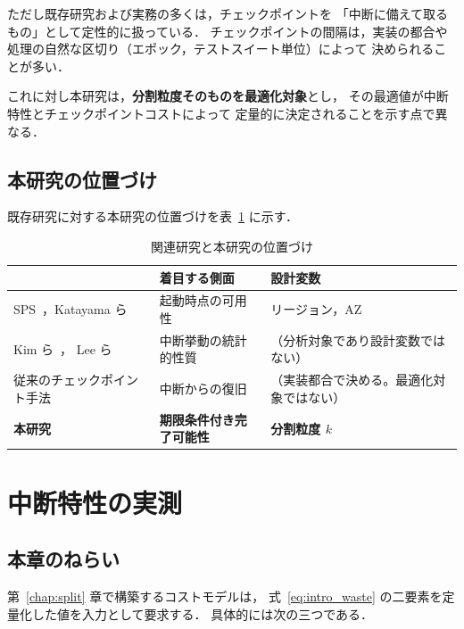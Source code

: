 \documentclass[11pt,a4paper]{ltjsreport}
\begin{document}
ただし既存研究および実務の多くは，チェックポイントを
「中断に備えて取るもの」として定性的に扱っている．
チェックポイントの間隔は，実装の都合や
処理の自然な区切り（エポック，テストスイート単位）によって
決められることが多い．

これに対し本研究は，\textbf{分割粒度そのものを最適化対象}とし，
その最適値が中断特性とチェックポイントコストによって
定量的に決定されることを示す点で異なる．

\section{本研究の位置づけ}

既存研究に対する本研究の位置づけを表~\ref{tab:related} に示す．

\begin{table}[htbp]
\centering
\caption{関連研究と本研究の位置づけ}
\label{tab:related}
\small
\begin{tabularx}{\textwidth}{@{}lXX@{}}
\toprule
 & \textbf{着目する側面} & \textbf{設計変数} \\
\midrule
SPS~\cite{AWSSPS}，Katayama ら~\cite{Katayama2022}
  & 起動時点の可用性
  & リージョン，AZ \\
\addlinespace
Kim ら~\cite{Kim2024SpotInterruption}，
Lee ら~\cite{Lee2022SpotLake}
  & 中断挙動の統計的性質
  & （分析対象であり設計変数ではない） \\
\addlinespace
従来のチェックポイント手法~\cite{Lin2022Survey}
  & 中断からの復旧
  & （実装都合で決める。最適化対象ではない） \\
\addlinespace
\textbf{本研究}
  & \textbf{期限条件付き完了可能性}
  & \textbf{分割粒度 $k$} \\
\bottomrule
\end{tabularx}
\end{table}

\chapter{中断特性の実測}
\label{chap:measure}

\section{本章のねらい}

第~\ref{chap:split} 章で構築するコストモデルは，
式~\eqref{eq:intro_waste} の二要素を定量化した値を入力として要求する．
具体的には次の三つである．
\end{document}

